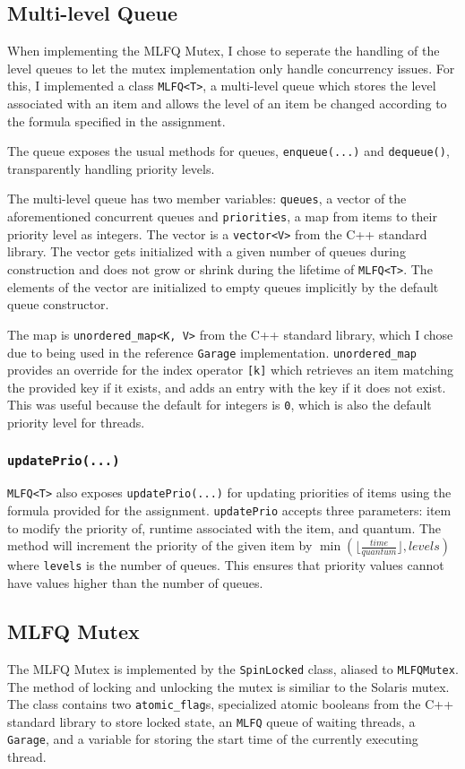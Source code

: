 \documentclass{article}
\begin{document}
\begin{multicols*}{2}
\subsection{Multi-level Queue}
When implementing the MLFQ Mutex, I chose to seperate the handling of the level queues to let the mutex implementation only handle concurrency issues. For this, I implemented a class \verb|MLFQ<T>|, a multi-level queue which stores the level associated with an item and allows the level of an item be changed according to the formula specified in the assignment.

The queue exposes the usual methods for queues, \verb|enqueue(...)| and \verb|dequeue()|, transparently handling priority levels.

The multi-level queue has two member variables: \verb|queues|, a vector of the aforementioned concurrent queues and \verb|priorities|, a map from items to their priority level as integers.
The vector is a \verb|vector<V>| from the C++ standard library. The vector gets initialized with a given number of queues during construction and does not grow or shrink during the lifetime of \verb|MLFQ<T>|. The elements of the vector are initialized to empty queues implicitly by the default queue constructor.

The map is \verb|unordered_map<K, V>| from the C++ standard library, which I chose due to being used in the reference \verb|Garage| implementation. \verb|unordered_map| provides an override for the index operator \verb|[k]| which retrieves an item matching the provided key if it exists, and adds an entry with the key if it does not exist. This was useful because the default for integers is \verb|0|, which is also the default priority level for threads.

\subsubsection{\texttt{updatePrio(...)}}
\verb|MLFQ<T>| also exposes \verb|updatePrio(...)| for updating priorities of items using the formula provided for the assignment. \verb|updatePrio| accepts three parameters: item to modify the priority of, runtime associated with the item, and quantum. The method will increment the priority of the given item by $\min(\lfloor\frac{time}{quantum}\rfloor, levels)$ where \verb|levels| is the number of queues. This ensures that priority values cannot have values higher than the number of queues.
\subsection{MLFQ Mutex}
The MLFQ Mutex is implemented by the \verb|SpinLocked| class, aliased to \verb|MLFQMutex|. The method of locking and unlocking the mutex is similiar to the Solaris mutex. The class contains two \verb|atomic_flag|s, specialized atomic booleans from the C++ standard library to store locked state, an \verb|MLFQ| queue of waiting threads, a \verb|Garage|, and a variable for storing the start time of the currently executing thread.


\end{multicols*}
\end{document}
